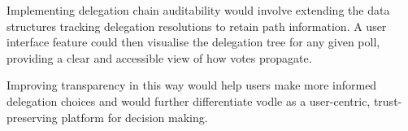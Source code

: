 Implementing delegation chain auditability would involve extending the data structures tracking delegation resolutions to retain path information. A user interface feature could then visualise the delegation tree for any given poll, providing a clear and accessible view of how votes propagate.

Improving transparency in this way would help users make more informed delegation choices and would further differentiate vodle as a user-centric, trust-preserving platform for decision making.







